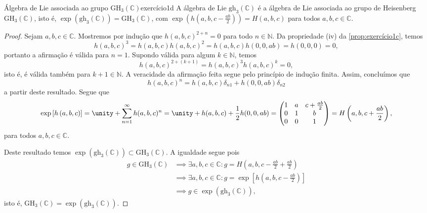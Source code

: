 \begin{proposition}{Álgebra de Lie associada ao grupo \(\mathrm{GH}_3(\mathbb{C})\)}{exercício1d}
    A álgebra de Lie \(\mathrm{gh}_3(\mathbb{C})\) é a álgebra de Lie associada ao grupo de Heisenberg \(\mathrm{GH}_3(\mathbb{C})\), isto é, \(\exp(\mathrm{gh}_3(\mathbb{C})) = \mathrm{GH}_3(\mathbb{C})\), com \(\exp(h(a,b,c-\frac{ab}{2})) = H(a,b,c)\) para todos \(a,b,c \in \mathbb{C}\).
\end{proposition}
\begin{proof}
    Sejam \(a,b,c \in \mathbb{C}\). Mostremos por indução que \(h(a,b,c)^{2+n} = 0\) para todo \(n \in \mathbb{N}\). Da propriedade (iv) da \cref{prop:exercício1c}, temos
    \begin{equation*}
        h(a,b,c)^3 = h(a,b,c) h(a,b,c)^2 = h(a,b,c) h(0,0,ab) = h(0,0,0) = 0,
    \end{equation*}
    portanto a afirmação é válida para \(n = 1\). Supondo válida para algum \(k \in \mathbb{N}\), temos
    \begin{equation*}
        h(a,b,c)^{2 + (k+1)} = h(a,b,c)^3 h(a,b,c)^k = 0 ,
    \end{equation*}
    isto é, é válida também para \(k + 1 \in \mathbb{N}\). A veracidade da afirmação feita segue pelo princípio de indução finita. Assim, concluímos que
    \begin{equation*}
        h(a,b,c)^{n} = h(a,b,c) \delta_{n1} + h(0,0,ab) \delta_{n2}
    \end{equation*}
    a partir deste resultado. Segue que
    \begin{equation*}
        \exp\left[h\left(a,b,c\right)\right] = \unity + \sum_{n = 1}^\infty h(a,b,c)^n = \unity + h(a,b,c) + \frac12 h(0,0,ab) = \begin{pmatrix}
            1 & a & c + \frac{ab}{2}\\
            0 & 1 & b\\
            0 & 0 & 1
        \end{pmatrix} = H\left(a,b,c + \frac{ab}{2}\right),
    \end{equation*}
    para todos \(a,b,c \in \mathbb{C}\).

    Deste resultado temos \(\exp(\mathrm{gh}_3(\mathbb{C})) \subset \mathrm{GH}_3(\mathbb{C})\). A igualdade segue pois
    \begin{align*}
        g \in \mathrm{GH}_3(\mathbb{C}) &\implies \exists a,b,c \in \mathbb{C} : g = H\left(a,b,c - \frac{ab}{2} + \frac{ab}{2}\right)\\
                                        &\implies \exists a,b,c \in \mathbb{C} : g = \exp\left[h\left(a,b,c - \frac{ab}{2}\right)\right]\\
                                        &\implies g \in \exp\left(\mathrm{gh}_3(\mathbb{C})\right),
    \end{align*}
    isto é, \(\mathrm{GH}_3(\mathbb{C}) = \exp(\mathrm{gh}_3(\mathbb{C}))\).
\end{proof}
